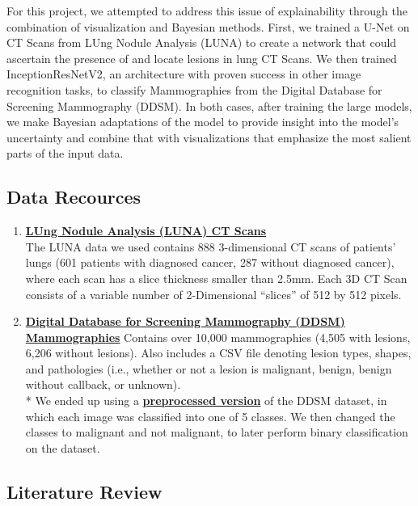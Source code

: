 \documentclass[12pt]{article}
\begin{document}
{For this project, we attempted to address this issue of explainability through the combination of visualization and Bayesian methods. First, we trained a U-Net on CT Scans from LUng Nodule Analysis (LUNA) to create a network that could ascertain the presence of and locate lesions in lung CT Scans. We then trained InceptionResNetV2, an architecture with proven success in other image recognition tasks, to classify Mammographies from the Digital Database for Screening Mammography (DDSM). In both cases, after training the large models, we make Bayesian adaptations of the model to provide insight into the model's uncertainty and combine that with visualizations that emphasize the most salient parts of the input data.

\subsection*{Data Recources}

\begin{enumerate}
\item \textbf{\href{https://wiki.cancerimagingarchive.net/display/Public/LIDC-IDRI}{LUng Nodule Analysis (LUNA) CT Scans}}\\
The LUNA data we used contains 888 3-dimensional CT scans of patients' lungs (601 patients with diagnosed cancer, 287 without diagnosed cancer), where each scan has a slice thickness smaller than 2.5mm. Each 3D CT Scan consists of a variable number of 2-Dimensional ``slices'' of 512 by 512 pixels. 

\item \textbf{\href{https://www.ncbi.nlm.nih.gov/pmc/articles/PMC3041807}{Digital Database for Screening Mammography (DDSM) Mammographies}}
Contains over 10,000 mammographies (4,505 with lesions, 6,206 without lesions). Also includes a CSV file denoting lesion types, shapes, and pathologies (i.e., whether or not a lesion is malignant, benign, benign without callback, or unknown). \\
* We ended up using a \textbf{\href{https://www.dropbox.com/sh/zxddynmk296frrq/AAD229pMOtKRTlWqB3xI1NSKa}{preprocessed version}} of the DDSM dataset, in which each image was classified into one of 5 classes. We then changed the classes to malignant and not malignant, to later perform binary classification on the dataset. 
\end{enumerate}

\subsection*{Literature Review}

}
\end{document}

